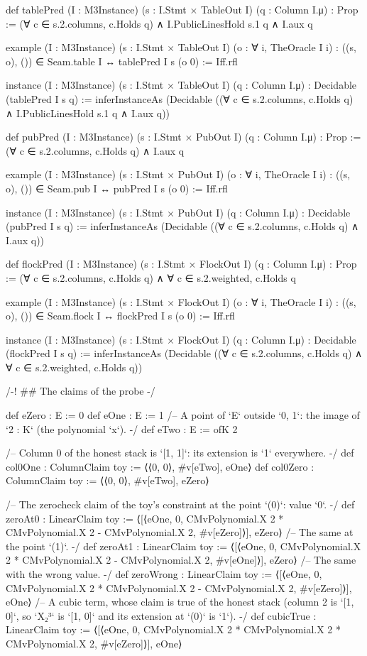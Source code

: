 \begin{leancode}
def tablePred (I : M3Instance) (s : I.Stmt × TableOut I) (q : Column I.μ) : Prop :=
  (∀ c ∈ s.2.columns, c.Holds q) ∧ I.PublicLinesHold s.1 q ∧ I.aux q

example (I : M3Instance) (s : I.Stmt × TableOut I) (o : ∀ i, TheOracle I i) :
    ((s, o), ()) ∈ Seam.table I ↔ tablePred I s (o 0) := Iff.rfl

instance (I : M3Instance) (s : I.Stmt × TableOut I) (q : Column I.μ) :
    Decidable (tablePred I s q) :=
  inferInstanceAs (Decidable ((∀ c ∈ s.2.columns, c.Holds q) ∧ I.PublicLinesHold s.1 q ∧
    I.aux q))

def pubPred (I : M3Instance) (s : I.Stmt × PubOut I) (q : Column I.μ) : Prop :=
  (∀ c ∈ s.2.columns, c.Holds q) ∧ I.aux q

example (I : M3Instance) (s : I.Stmt × PubOut I) (o : ∀ i, TheOracle I i) :
    ((s, o), ()) ∈ Seam.pub I ↔ pubPred I s (o 0) := Iff.rfl

instance (I : M3Instance) (s : I.Stmt × PubOut I) (q : Column I.μ) :
    Decidable (pubPred I s q) :=
  inferInstanceAs (Decidable ((∀ c ∈ s.2.columns, c.Holds q) ∧ I.aux q))

def flockPred (I : M3Instance) (s : I.Stmt × FlockOut I) (q : Column I.μ) : Prop :=
  (∀ c ∈ s.2.columns, c.Holds q) ∧ ∀ c ∈ s.2.weighted, c.Holds q

example (I : M3Instance) (s : I.Stmt × FlockOut I) (o : ∀ i, TheOracle I i) :
    ((s, o), ()) ∈ Seam.flock I ↔ flockPred I s (o 0) := Iff.rfl

instance (I : M3Instance) (s : I.Stmt × FlockOut I) (q : Column I.μ) :
    Decidable (flockPred I s q) :=
  inferInstanceAs (Decidable ((∀ c ∈ s.2.columns, c.Holds q) ∧ ∀ c ∈ s.2.weighted, c.Holds q))

/-! ## The claims of the probe -/

def eZero : E := 0
def eOne : E := 1
/-- A point of `E` outside `{0, 1}`: the image of `2 : K` (the polynomial `x`). -/
def eTwo : E := ofK 2

/-- Column 0 of the honest stack is `[1, 1]`: its extension is `1` everywhere. -/
def col0One : ColumnClaim toy := ⟨⟨0, 0⟩, #v[eTwo], eOne⟩
def col0Zero : ColumnClaim toy := ⟨⟨0, 0⟩, #v[eTwo], eZero⟩

/-- The zerocheck claim of the toy's constraint at the point `(0)`: value `0`. -/
def zeroAt0 : LinearClaim toy :=
  ⟨[⟨eOne, 0, CMvPolynomial.X 2 * CMvPolynomial.X 2 - CMvPolynomial.X 2, #v[eZero]⟩], eZero⟩
/-- The same at the point `(1)`. -/
def zeroAt1 : LinearClaim toy :=
  ⟨[⟨eOne, 0, CMvPolynomial.X 2 * CMvPolynomial.X 2 - CMvPolynomial.X 2, #v[eOne]⟩], eZero⟩
/-- The same with the wrong value. -/
def zeroWrong : LinearClaim toy :=
  ⟨[⟨eOne, 0, CMvPolynomial.X 2 * CMvPolynomial.X 2 - CMvPolynomial.X 2, #v[eZero]⟩], eOne⟩
/-- A cubic term, whose claim is true of the honest stack (column 2 is `[1, 0]`, so `X₂³` is
`[1, 0]` and its extension at `(0)` is `1`). -/
def cubicTrue : LinearClaim toy :=
  ⟨[⟨eOne, 0, CMvPolynomial.X 2 * CMvPolynomial.X 2 * CMvPolynomial.X 2, #v[eZero]⟩], eOne⟩


\end{leancode}
